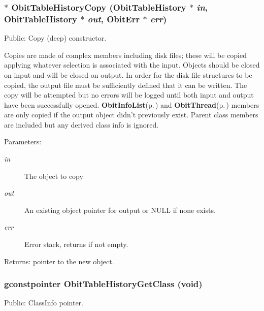 \subsubsection{$\ast$ Obit\-Table\-History\-Copy ({\bf Obit\-Table\-History} $\ast$ {\em in}, {\bf Obit\-Table\-History} $\ast$ {\em out}, {\bf Obit\-Err} $\ast$ {\em err})}\label{ObitTableHistory_8c_a20}


Public: Copy (deep) constructor. 

Copies are made of complex members including disk files; these will be copied applying whatever selection is associated with the input. Objects should be closed on input and will be closed on output. In order for the disk file structures to be copied, the output file must be sufficiently defined that it can be written. The copy will be attempted but no errors will be logged until both input and output have been successfully opened. {\bf Obit\-Info\-List}{\rm (p.\,\pageref{structObitInfoList})} and {\bf Obit\-Thread}{\rm (p.\,\pageref{structObitThread})} members are only copied if the output object didn't previously exist. Parent class members are included but any derived class info is ignored. \begin{Desc}
\item[Parameters:]
\begin{description}
\item[{\em in}]The object to copy \item[{\em out}]An existing object pointer for output or NULL if none exists. \item[{\em err}]Error stack, returns if not empty. \end{description}
\end{Desc}
\begin{Desc}
\item[Returns:]pointer to the new object. \end{Desc}
\subsubsection{\setlength{\rightskip}{0pt plus 5cm}gconstpointer Obit\-Table\-History\-Get\-Class (void)}\label{ObitTableHistory_8c_a17}


Public: Class\-Info pointer. 

